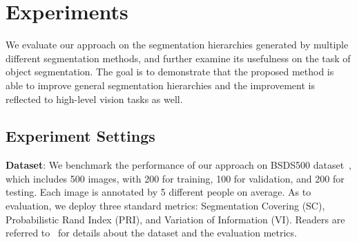 \section{Experiments}
\label{sec:experiments}
We evaluate our approach on the segmentation hierarchies generated by
multiple different segmentation methods, and further examine its
usefulness on the task of object segmentation. The goal is to
demonstrate that the proposed method is able to improve general
segmentation hierarchies and the improvement is reflected to
high-level vision tasks as well.


\subsection{Experiment Settings}
\label{sec:settings}
\textbf{Dataset}:
We benchmark the performance of our approach on BSDS500
dataset~\cite{arbelaez2011contour}, which includes 500 images, with
200 for training, 100 for validation, and 200 for testing.  Each image is
annotated by 5 different people on average. As to evaluation, we
deploy three standard metrics: Segmentation Covering (SC),
Probabilistic Rand Index (PRI), and Variation of Information
(VI). Readers are referred to~\cite{arbelaez2011contour} for details
about the dataset and the evaluation metrics.

